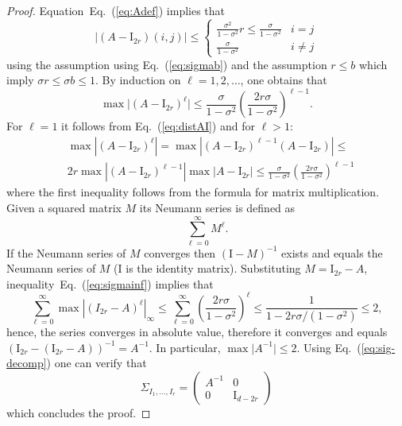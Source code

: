 \documentclass[final, 12pt]{colt2018}
\renewcommand{\eqref}[1]{Eq.~(\ref{#1})}
\begin{document}
\begin{proof}
Equation~\eqref{eq:Adef} implies that
\begin{equation}\label{eq:distAI}
\lvert \left( A - \mathrm{I}_{2r}\right)(i,j) \rvert 
\le \begin{cases}
\frac{\sigma^2}{1-\sigma^2}r \le \frac{\sigma}{1-\sigma^2} & i=j \\
\frac{\sigma}{1-\sigma^2} & i\ne j
\end{cases}
\end{equation}
using the assumption using \eqref{eq:sigmab} and the assumption $r\le b$ which imply $\sigma r \le \sigma b \le 1$. By induction on $\ell = 1,2,\dots$, one obtains that
\begin{equation}\label{eq:sigmainf}
\max\lvert (A-\mathrm{I}_{2r})^\ell\rvert \le
\frac{\sigma}{1-\sigma^2} \left( \frac{2r \sigma}{1-\sigma^2} \right)^{\ell-1}.
\end{equation}
For $\ell = 1$ it follows from \eqref{eq:distAI} and for $\ell > 1$:
\begin{align*}
&\max \left\lvert (A-\mathrm{I}_{2r})^\ell\right\rvert
=\max \left\lvert (A-\mathrm{I}_{2r})^{\ell-1} (A-\mathrm{I}_{2r}) \right\rvert\le \\
&2r \max \left\lvert (A-\mathrm{I}_{2r})^{\ell-1}\right\rvert \max \left\lvert A-\mathrm{I}_{2r} \right\rvert
\le\frac{\sigma}{1-\sigma^2} \left( \frac{2r \sigma}{1-\sigma^2} \right)^{\ell-1}
\end{align*}
where the first inequality follows from the formula for matrix multiplication.
Given a squared matrix $M$ its Neumann series is defined as 
\[
\sum_{\ell=0}^\infty M^\ell.
\]
If the Neumann series of $M$ converges then $(\mathrm{I}-M)^{-1}$ exists and equals the Neumann series of $M$ ($\mathrm{I}$ is the identity matrix). Substituting $M =\mathrm{I}_{2r} -A$, inequality~\eqref{eq:sigmainf} implies that
\begin{equation}\label{eq:76}
\sum_{\ell=0}^\infty \max \left\lvert (I_{2r}-A)^{\ell} \right\rvert_\infty
\le \sum_{\ell=0}^\infty \left( \frac{2r \sigma}{1-\sigma^2} \right)^\ell
\le \frac{1}{1-2r \sigma/(1-\sigma^2)}
\le 2,
\end{equation}
hence, the series converges in absolute value, therefore it converges and equals $(\mathrm{I}_{2r} - (\mathrm{I}_{2r} - A))^{-1} = A^{-1}$. In particular, $\max \lvert A^{-1} \rvert \le 2$. Using \eqref{eq:sig-decomp} one can verify that
\[
\Sigma_{I_1,\dots,I_r} = \begin{pmatrix}
A^{-1} & 0 \\
0 & \mathrm{I}_{d-2r}
\end{pmatrix}
\]
which concludes the proof.
\end{proof}
\end{document}
